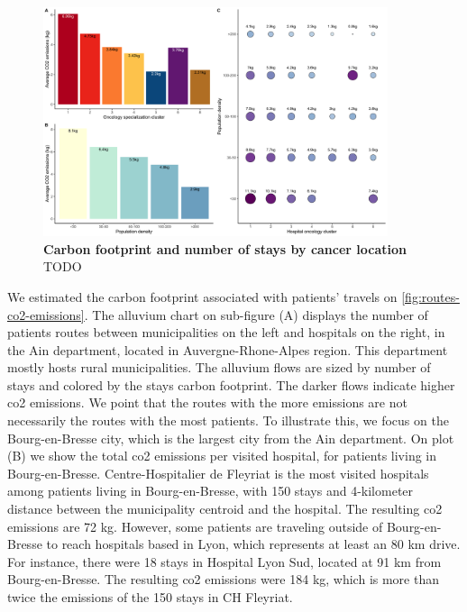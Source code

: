 \begin{figure}[h!]
    \includegraphics[width=0.9\textwidth]{images/routes/sup_fig_5.png}
    \centering
    \caption{
        \textbf{Carbon footprint and number of stays by cancer location}
        TODO }
    \label{fig:avg-carbon-footprint-density-cluster}
\end{figure}

We estimated the carbon footprint associated with patients' travels on
\cref{fig:routes-co2-emissions}. The alluvium chart on
sub-figure (A) displays the number of patients routes between municipalities on
the left and hospitals on the right, in the Ain department, located in
Auvergne-Rhone-Alpes region. This department mostly hosts rural municipalities.
The alluvium flows are sized by number of stays and colored by the stays carbon
footprint. The darker flows indicate higher \ac{co2} emissions. We point that
the routes with the more emissions are not necessarily the routes with the most
patients. To illustrate this, we focus on the Bourg-en-Bresse city, which is the
largest city from the Ain department. On plot (B) we show the total \ac{co2}
emissions per visited hospital, for patients living in Bourg-en-Bresse.
Centre-Hospitalier de Fleyriat is the most visited hospitals among patients
living in Bourg-en-Bresse, with 150 stays and 4-kilometer distance between the
municipality centroid and the hospital. The resulting \ac{co2} emissions are 72
kg. However, some patients are traveling outside of Bourg-en-Bresse to reach
hospitals based in Lyon, which represents at least an 80 km drive. For instance,
there were 18 stays in Hospital Lyon Sud, located at 91 km from Bourg-en-Bresse.
The resulting \ac{co2} emissions were 184 kg, which is more than twice the
emissions of the 150 stays in CH Fleyriat.

